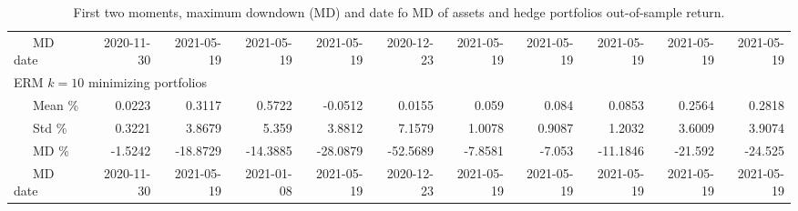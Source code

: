 \begin{table}[!]
{\begin{tabular}{l*{10}{r}}
\ \ \ MD date &  2020-11-30 &  2021-05-19 &  2021-05-19 &  2021-05-19 &  2020-12-23 &  2021-05-19 &  2021-05-19 &  2021-05-19 &  2021-05-19 &  2021-05-19 \\
  \multicolumn{10}{l}{ERM $k=10$ minimizing portfolios}   \\
\ \ \ Mean \%  &      0.0223 &      0.3117 &      0.5722 &     -0.0512 &      0.0155 &       0.059 &       0.084 &      0.0853 &      0.2564 &      0.2818 \\
\ \ \ Std \%   &      0.3221 &      3.8679 &       5.359 &      3.8812 &      7.1579 &      1.0078 &      0.9087 &      1.2032 &      3.6009 &      3.9074 \\
\ \ \ MD \%    &     -1.5242 &    -18.8729 &    -14.3885 &    -28.0879 &    -52.5689 &     -7.8581 &      -7.053 &    -11.1846 &     -21.592 &     -24.525 \\
\ \ \ MD date &  2020-11-30 &  2021-05-19 &  2021-01-08 &  2021-05-19 &  2020-12-23 &  2021-05-19 &  2021-05-19 &  2021-05-19 &  2021-05-19 &  2021-05-19 \\
\bottomrule
\end{tabular}}
  \caption{First two moments, maximum downdown (MD) and date fo MD of assets and hedge portfolios out-of-sample return.}
  \label{tab:bigTable}
\end{table}